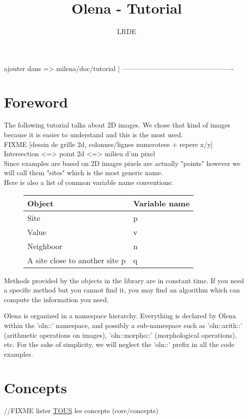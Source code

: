 \documentclass{report}
\title{Olena - Tutorial
}
\author{LRDE}
\date{}
\begin{document}
\tableofcontents

ajouter dans => milena/doc/tutorial  |
-------------------------------------------------

\chapter{Foreword}

The following tutorial talks about 2D images. We chose that kind of images
because it is easier to understand and this is the
most used. \\

FIXME
[dessin de grille 2d, colonnes/lignes numerotees + repere x/y]
Intersection <=> point 2d <=> milieu d'un pixel \\

Since examples are based on 2D images pixels are actually "points" however we
will call them "sites" which is the most generic name.\\

Here is also a list of common variable name conventions:
\begin{figure}[ht!]
  \begin{tabular}{|l|l|}
  \hline
  \textbf{Object} & \textbf{Variable name} \\ \hline
  Site & p                            \\ \hline
  Value & v                           \\ \hline
  Neighboor & n                       \\ \hline
  A site close to another site p & q  \\ \hline
  \end{tabular}
\end{figure}

Methods provided by the objects in the library are in constant time. If you need
a specific method but you cannot find it, you may find an algorithm which can
compute the information you need.

Olena is organized in a namespace hierarchy.  Everything is declared by Olena
within the 'oln::' namespace, and possibly a sub-namespace such as
'oln::arith::' (arithmetic operations on images), 'oln::morpho::' (morphological
operations), etc.  For the sake of simplicity, we will neglect the 'oln::'
prefix in all the code examples.


\chapter{Concepts}
//FIXME lister \underline{TOUS} les concepts (core/concepts)
\end{document}
